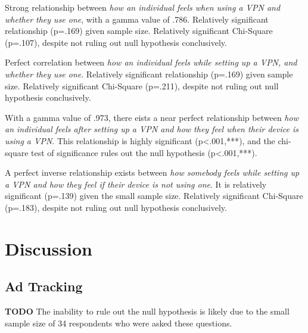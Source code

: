 \documentclass[acmtog]{acmart}
\begin{document}
Strong relationship between \emph{how an individual feels when using a VPN and
whether they use one}, with a gamma value of .786. Relatively significant
relationship (p=.169) given sample size.  Relatively significant Chi-Square
(p=.107), despite not ruling out null hypothesis conclusively.

Perfect correlation between \emph{how an individual feels while setting up a
VPN, and whether they use one}. Relatively significant relationship (p=.169)
given sample size. Relatively significant Chi-Square (p=.211), despite not
ruling out null hypothesis conclusively.

With a gamma value of .973, there eists a near perfect relationship between
\emph{how an individual feels after setting up a VPN and how they feel when
their device is using a VPN}. This relationship is highly significant
(p<.001,***), and the chi-square test of significance rules out the null
hypothesis (p<.001,***).

A perfect inverse relationship exists between \emph{how somebody feels while
setting up a VPN and how they feel if their device is not using one}. It is
relatively significant (p=.139) given the small sample size.  Relatively
significant Chi-Square (p=.183), despite not ruling out null hypothesis
conclusively.

\section{Discussion}
\subsection{Ad Tracking}
\textbf{TODO}
The inability to rule out the null hypothesis is likely due to the small sample
size of 34 respondents who were asked these questions.





\appendix
\end{document}
